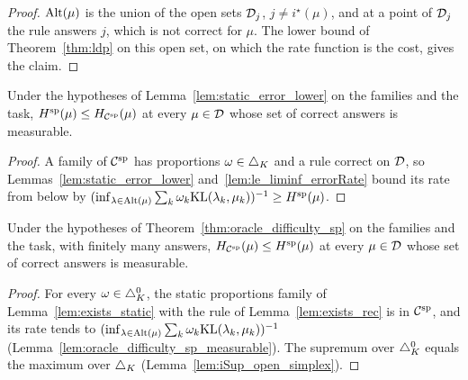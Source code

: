 \begin{proof}
  \leanok
  $\mathrm{Alt}(\mu)$ is the union of the open sets $\mathcal{D}_j$, $j \ne i^{\star}(\mu)$, and at a point of
  $\mathcal{D}_j$ the rule answers $j$, which is not correct for $\mu$. The lower bound of
  Theorem~\ref{thm:ldp} on this open set, on which the rate function is the cost, gives the claim.
\end{proof}

\begin{lemma}
  \label{lem:staticClass_le_oracleDifficulty}
  \leanok
  Under the hypotheses of Lemma~\ref{lem:static_error_lower} on the families and the task,
  $H^{\mathrm{sp}}(\mu) \le H_{\mathcal{C}^{\mathrm{sp}}}(\mu)$ at every $\mu \in \mathcal{D}$ whose set of correct answers is measurable.
\end{lemma}

\begin{proof}
  \leanok
  A family of $\mathcal{C}^{\mathrm{sp}}$ has proportions $\omega \in \triangle_K$ and a rule correct on $\mathcal{D}$, so
  Lemmas~\ref{lem:static_error_lower} and~\ref{lem:le_liminf_errorRate} bound its rate from below by
  $(\inf_{\lambda \in \mathrm{Alt}(\mu)} \sum_k \omega_k \mathrm{KL}(\lambda_k, \mu_k))^{-1} \ge H^{\mathrm{sp}}(\mu)$.
\end{proof}

\begin{lemma}
  \label{lem:oracleDifficulty_staticClass_le}
  \leanok
  Under the hypotheses of Theorem~\ref{thm:oracle_difficulty_sp} on the families and the task,
  with finitely many answers, $H_{\mathcal{C}^{\mathrm{sp}}}(\mu) \le H^{\mathrm{sp}}(\mu)$ at every $\mu \in \mathcal{D}$ whose set of
  correct answers is measurable.
\end{lemma}

\begin{proof}
  \leanok
  For every $\omega \in \triangle_K^0$, the static proportions family of
  Lemma~\ref{lem:exists_static} with the rule of Lemma~\ref{lem:exists_rec} is in $\mathcal{C}^{\mathrm{sp}}$, and its
  rate tends to $(\inf_{\lambda \in \mathrm{Alt}(\mu)} \sum_k \omega_k \mathrm{KL}(\lambda_k, \mu_k))^{-1}$
  (Lemma~\ref{lem:oracle_difficulty_sp_measurable}). The supremum over $\triangle_K^0$ equals the
  maximum over $\triangle_K$ (Lemma~\ref{lem:iSup_open_simplex}).
\end{proof}

